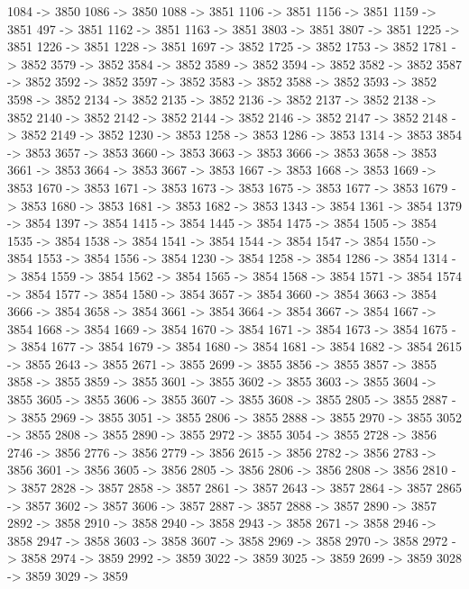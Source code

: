 {	1084 -> 3850
	1086 -> 3850
	1088 -> 3851
	1106 -> 3851
	1156 -> 3851
	1159 -> 3851
	497 -> 3851
	1162 -> 3851
	1163 -> 3851
	3803 -> 3851
	3807 -> 3851
	1225 -> 3851
	1226 -> 3851
	1228 -> 3851
	1697 -> 3852
	1725 -> 3852
	1753 -> 3852
	1781 -> 3852
	3579 -> 3852
	3584 -> 3852
	3589 -> 3852
	3594 -> 3852
	3582 -> 3852
	3587 -> 3852
	3592 -> 3852
	3597 -> 3852
	3583 -> 3852
	3588 -> 3852
	3593 -> 3852
	3598 -> 3852
	2134 -> 3852
	2135 -> 3852
	2136 -> 3852
	2137 -> 3852
	2138 -> 3852
	2140 -> 3852
	2142 -> 3852
	2144 -> 3852
	2146 -> 3852
	2147 -> 3852
	2148 -> 3852
	2149 -> 3852
	1230 -> 3853
	1258 -> 3853
	1286 -> 3853
	1314 -> 3853
	3854 -> 3853
	3657 -> 3853
	3660 -> 3853
	3663 -> 3853
	3666 -> 3853
	3658 -> 3853
	3661 -> 3853
	3664 -> 3853
	3667 -> 3853
	1667 -> 3853
	1668 -> 3853
	1669 -> 3853
	1670 -> 3853
	1671 -> 3853
	1673 -> 3853
	1675 -> 3853
	1677 -> 3853
	1679 -> 3853
	1680 -> 3853
	1681 -> 3853
	1682 -> 3853
	1343 -> 3854
	1361 -> 3854
	1379 -> 3854
	1397 -> 3854
	1415 -> 3854
	1445 -> 3854
	1475 -> 3854
	1505 -> 3854
	1535 -> 3854
	1538 -> 3854
	1541 -> 3854
	1544 -> 3854
	1547 -> 3854
	1550 -> 3854
	1553 -> 3854
	1556 -> 3854
	1230 -> 3854
	1258 -> 3854
	1286 -> 3854
	1314 -> 3854
	1559 -> 3854
	1562 -> 3854
	1565 -> 3854
	1568 -> 3854
	1571 -> 3854
	1574 -> 3854
	1577 -> 3854
	1580 -> 3854
	3657 -> 3854
	3660 -> 3854
	3663 -> 3854
	3666 -> 3854
	3658 -> 3854
	3661 -> 3854
	3664 -> 3854
	3667 -> 3854
	1667 -> 3854
	1668 -> 3854
	1669 -> 3854
	1670 -> 3854
	1671 -> 3854
	1673 -> 3854
	1675 -> 3854
	1677 -> 3854
	1679 -> 3854
	1680 -> 3854
	1681 -> 3854
	1682 -> 3854
	2615 -> 3855
	2643 -> 3855
	2671 -> 3855
	2699 -> 3855
	3856 -> 3855
	3857 -> 3855
	3858 -> 3855
	3859 -> 3855
	3601 -> 3855
	3602 -> 3855
	3603 -> 3855
	3604 -> 3855
	3605 -> 3855
	3606 -> 3855
	3607 -> 3855
	3608 -> 3855
	2805 -> 3855
	2887 -> 3855
	2969 -> 3855
	3051 -> 3855
	2806 -> 3855
	2888 -> 3855
	2970 -> 3855
	3052 -> 3855
	2808 -> 3855
	2890 -> 3855
	2972 -> 3855
	3054 -> 3855
	2728 -> 3856
	2746 -> 3856
	2776 -> 3856
	2779 -> 3856
	2615 -> 3856
	2782 -> 3856
	2783 -> 3856
	3601 -> 3856
	3605 -> 3856
	2805 -> 3856
	2806 -> 3856
	2808 -> 3856
	2810 -> 3857
	2828 -> 3857
	2858 -> 3857
	2861 -> 3857
	2643 -> 3857
	2864 -> 3857
	2865 -> 3857
	3602 -> 3857
	3606 -> 3857
	2887 -> 3857
	2888 -> 3857
	2890 -> 3857
	2892 -> 3858
	2910 -> 3858
	2940 -> 3858
	2943 -> 3858
	2671 -> 3858
	2946 -> 3858
	2947 -> 3858
	3603 -> 3858
	3607 -> 3858
	2969 -> 3858
	2970 -> 3858
	2972 -> 3858
	2974 -> 3859
	2992 -> 3859
	3022 -> 3859
	3025 -> 3859
	2699 -> 3859
	3028 -> 3859
	3029 -> 3859
}
